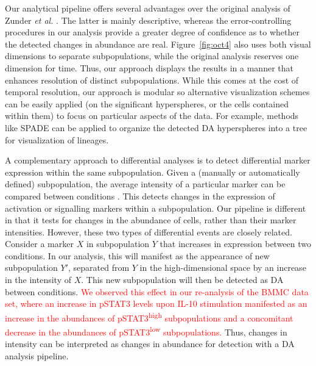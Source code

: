 \documentclass{article}
\newcommand\revised[1]{\textcolor{red}{#1}}
\begin{document}
Our analytical pipeline offers several advantages over the original analysis of Zunder \emph{et al.} \cite{zunder2015continuous}.
The latter is mainly descriptive, whereas the error-controlling procedures in our analysis provide a greater degree of confidence as to whether the detected changes in abundance are real.
Figure~\ref{fig:oct4} also uses both visual dimensions to separate subpopulations, while the original analysis reserves one dimension for time.
Thus, our approach displays the results in a manner that enhances resolution of distinct subpopulations.
While this comes at the cost of temporal resolution, our approach is modular so alternative visualization schemes can be easily applied (on the significant hyperspheres, or the cells contained within them) to focus on particular aspects of the data.
For example, methods like SPADE can be applied to organize the detected DA hyperspheres into a tree for visualization of lineages.

A complementary approach to differential analyses is to detect differential marker expression within the same subpopulation.
Given a (manually or automatically defined) subpopulation, the average intensity of a particular marker can be compared between conditions \cite{anchang2016visualization,behbehani2015mass}.
This detects changes in the expression of activation or signalling markers within a subpopulation.
Our pipeline is different in that it tests for changes in the abundance of cells, rather than their marker intensities.
However, these two types of differential events are closely related.
Consider a marker $X$ in subpopulation $Y$ that increases in expression between two conditions. 
In our analysis, this will manifest as the appearance of new subpopulation $Y'$, separated from $Y$ in the high-dimensional space by an increase in the intensity of $X$.
This new subpopulation will then be detected as DA between conditions.
\revised{We observed this effect in our re-analysis of the BMMC data set, where an increase in pSTAT3 levels upon IL-10 stimulation manifested as an increase in the abundances of pSTAT3\textsuperscript{high} subpopulations and a concomitant decrease in the abundances of pSTAT3\textsuperscript{low} subpopulations.}
Thus, changes in intensity can be interpreted as changes in abundance for detection with a DA analysis pipeline.
\end{document}
